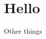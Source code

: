 \documentclass[paper.tex]{subfiles}
\begin{document}
	\section{Hello}
	Other things 
\end{document}
